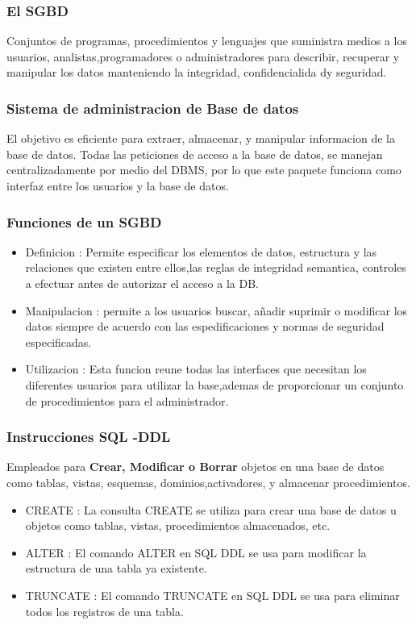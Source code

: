\documentclass{article}
\begin{document}
\begin{multicols}{2}
         \subsubsection{El SGBD}
          Conjuntos de programas, procedimientos y lenguajes que suministra medios a los usuarios, analistas,programadores o administradores para describir,
          recuperar y manipular los datos manteniendo la integridad, confidencialida dy seguridad.
         \subsubsection{Sistema de administracion de Base de datos }
         El objetivo es eficiente para extraer, almacenar, y manipular informacion de la base de datos.
         Todas las peticiones de acceso a la base de datos, se manejan centralizadamente por medio del DBMS, por lo que este paquete funciona como interfaz entre los usuarios y la base de datos.
         \subsubsection{Funciones de un SGBD}
            \begin{itemize}
                \item Definicion : Permite especificar los elementos de datos, estructura y las relaciones que existen entre ellos,las reglas de integridad semantica, controles a efectuar antes de autorizar el acceso a la DB.
                \item Manipulacion : permite a los usuarios buscar, añadir suprimir o modificar los datos siempre de acuerdo con las espedificaciones y normas de seguridad especificadas.
                \item Utilizacion : Esta funcion reune todas las interfaces que necesitan los diferentes usuarios para utilizar la base,ademas de proporcionar un conjunto de procedimientos para el administrador.
            \end{itemize}
         \subsubsection{Instrucciones  SQL -DDL}
         Empleados para \textbf{Crear, Modificar o Borrar} objetos en una base de datos como tablas, vistas, esquemas, dominios,activadores, y almacenar procedimientos.
         \begin{itemize}
            \item CREATE : La consulta CREATE se utiliza para crear una base de datos u objetos como tablas, vistas, procedimientos almacenados, etc.
            \item ALTER : El comando ALTER en SQL DDL se usa para modificar la estructura de una tabla ya existente.
            \item TRUNCATE : El comando TRUNCATE en SQL DDL se usa para eliminar todos los registros de una tabla.
         \end{itemize}

\end{multicols}
\end{document}

